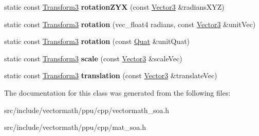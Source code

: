 \begin{DoxyCompactItemize}
\item 
\hypertarget{classVectormath_1_1Soa_1_1Transform3_a1e6fed24c6f3379c5f5a398a56e44a59}{static const \hyperlink{classVectormath_1_1Soa_1_1Transform3}{Transform3} {\bfseries rotation\-Z\-Y\-X} (const \hyperlink{classVectormath_1_1Soa_1_1Vector3}{Vector3} \&radians\-X\-Y\-Z)}\label{classVectormath_1_1Soa_1_1Transform3_a1e6fed24c6f3379c5f5a398a56e44a59}

\item 
\hypertarget{classVectormath_1_1Soa_1_1Transform3_a9f8c5b23efb6da24984f72b5893d00b5}{static const \hyperlink{classVectormath_1_1Soa_1_1Transform3}{Transform3} {\bfseries rotation} (vec\-\_\-float4 radians, const \hyperlink{classVectormath_1_1Soa_1_1Vector3}{Vector3} \&unit\-Vec)}\label{classVectormath_1_1Soa_1_1Transform3_a9f8c5b23efb6da24984f72b5893d00b5}

\item 
\hypertarget{classVectormath_1_1Soa_1_1Transform3_ab4ae389151533bd295c0b55b3c8d67f0}{static const \hyperlink{classVectormath_1_1Soa_1_1Transform3}{Transform3} {\bfseries rotation} (const \hyperlink{classVectormath_1_1Soa_1_1Quat}{Quat} \&unit\-Quat)}\label{classVectormath_1_1Soa_1_1Transform3_ab4ae389151533bd295c0b55b3c8d67f0}

\item 
\hypertarget{classVectormath_1_1Soa_1_1Transform3_a5141ae4f8caa0add6ef0ecc7cde1b378}{static const \hyperlink{classVectormath_1_1Soa_1_1Transform3}{Transform3} {\bfseries scale} (const \hyperlink{classVectormath_1_1Soa_1_1Vector3}{Vector3} \&scale\-Vec)}\label{classVectormath_1_1Soa_1_1Transform3_a5141ae4f8caa0add6ef0ecc7cde1b378}

\item 
\hypertarget{classVectormath_1_1Soa_1_1Transform3_a955d6eaa884e48ca85fea54f20065de9}{static const \hyperlink{classVectormath_1_1Soa_1_1Transform3}{Transform3} {\bfseries translation} (const \hyperlink{classVectormath_1_1Soa_1_1Vector3}{Vector3} \&translate\-Vec)}\label{classVectormath_1_1Soa_1_1Transform3_a955d6eaa884e48ca85fea54f20065de9}

\end{DoxyCompactItemize}


The documentation for this class was generated from the following files\-:\begin{DoxyCompactItemize}
\item 
src/include/vectormath/ppu/cpp/vectormath\-\_\-soa.\-h\item 
src/include/vectormath/ppu/cpp/mat\-\_\-soa.\-h\end{DoxyCompactItemize}
